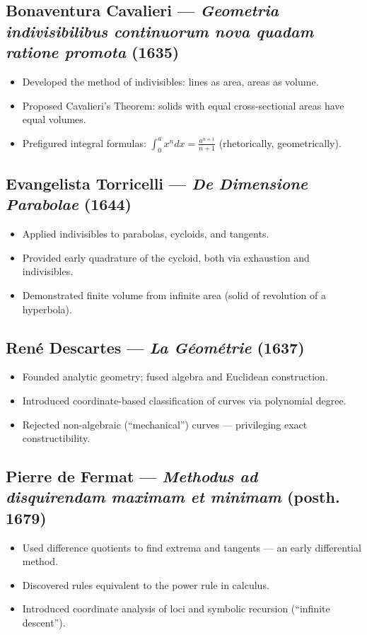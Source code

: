 \documentclass[9pt]{article}
\begin{document}
\subsection*{Bonaventura Cavalieri — \textit{Geometria indivisibilibus continuorum nova quadam ratione promota} (1635)}
\begin{itemize}
  \item Developed the method of indivisibles: lines as area, areas as volume.
  \item Proposed Cavalieri’s Theorem: solids with equal cross-sectional areas have equal volumes.
  \item Prefigured integral formulas: \(\int_0^a x^n dx = \frac{a^{n+1}}{n+1}\) (rhetorically, geometrically).
\end{itemize}

\subsection*{Evangelista Torricelli — \textit{De Dimensione Parabolae} (1644)}
\begin{itemize}
  \item Applied indivisibles to parabolas, cycloids, and tangents.
  \item Provided early quadrature of the cycloid, both via exhaustion and indivisibles.
  \item Demonstrated finite volume from infinite area (solid of revolution of a hyperbola).
\end{itemize}

\subsection*{René Descartes — \textit{La Géométrie} (1637)}
\begin{itemize}
  \item Founded analytic geometry; fused algebra and Euclidean construction.
  \item Introduced coordinate-based classification of curves via polynomial degree.
  \item Rejected non-algebraic (``mechanical'') curves — privileging exact constructibility.
\end{itemize}

\subsection*{Pierre de Fermat — \textit{Methodus ad disquirendam maximam et minimam} (posth. 1679)}
\begin{itemize}
  \item Used difference quotients to find extrema and tangents — an early differential method.
  \item Discovered rules equivalent to the power rule in calculus.
  \item Introduced coordinate analysis of loci and symbolic recursion (``infinite descent'').
\end{itemize}
\end{document}
